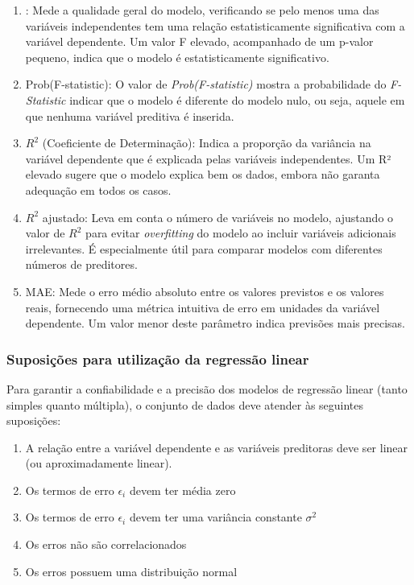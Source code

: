 \begin{enumerate}
    \item {}: Mede a qualidade geral do modelo, verificando se pelo menos uma das variáveis independentes tem uma relação estatisticamente significativa com a variável dependente. Um valor F elevado, acompanhado de um p-valor pequeno, indica que o modelo é estatisticamente significativo.
    \item Prob(F-statistic): O valor de \textit{Prob(F-statistic)} mostra a probabilidade do \textit{F-Statistic} indicar que o modelo é diferente do modelo nulo, ou seja, aquele em que nenhuma variável preditiva é inserida. 
    \item $R^2$ (Coeficiente de Determinação): Indica a proporção da variância na variável dependente que é explicada pelas variáveis independentes. Um R² elevado sugere que o modelo explica bem os dados, embora não garanta adequação em todos os casos.
    \item $R^2$ ajustado: Leva em conta o número de variáveis no modelo, ajustando o valor de $R^2$ para evitar \textit{overfitting} do modelo ao incluir variáveis adicionais irrelevantes. É especialmente útil para comparar modelos com diferentes números de preditores.
    \item \acrfull{MAE}: Mede o erro médio absoluto entre os valores previstos e os valores reais, fornecendo uma métrica intuitiva de erro em unidades da variável dependente. Um valor menor deste parâmetro indica previsões mais precisas.
\end{enumerate}

\subsubsection{Suposições para utilização da regressão linear}
Para garantir a confiabilidade e a precisão dos modelos de regressão linear (tanto simples quanto múltipla), o conjunto de dados deve atender às seguintes suposições:
\begin{enumerate}
    \item A relação entre a variável dependente e as variáveis preditoras deve ser linear (ou aproximadamente linear).
    \item Os termos de erro $\epsilon_i$ devem ter média zero
    \item Os termos de erro $\epsilon_i$ devem ter uma variância constante $\sigma^2$
    \item Os erros não são correlacionados
    \item Os erros possuem uma distribuição normal
\end{enumerate}

